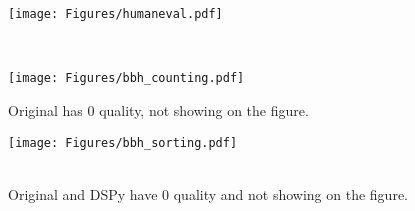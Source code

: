 {
\begin{figure*}[th]
\begin{minipage}{0.67\columnwidth}
\begin{center}\centerline{\texttt{[image: Figures/humaneval.pdf]}}
{ \\
}
\end{center}
\end{minipage}
\hfill
\begin{minipage}{0.67\columnwidth}
\begin{center}
\centerline{\texttt{[image: Figures/bbh\_counting.pdf]}}
{
Original has 0 quality, not showing on the figure.
}
\end{center}
\end{minipage}
\hfill
\begin{minipage}{0.67\columnwidth}
\begin{center}\centerline{\texttt{[image: Figures/bbh\_sorting.pdf]}}
{ \\
Original and DSPy have 0 quality and not showing on the figure.
}
\end{center}
\end{minipage}
\end{figure*}
}